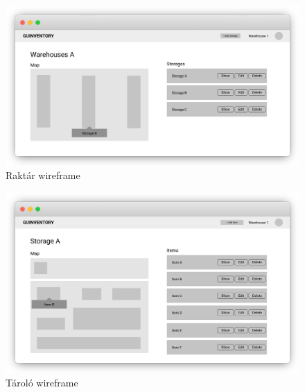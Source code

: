 \begin{figure}[!ht]
  \centering
  \includegraphics[width=150mm, keepaspectratio]{figures/wireframes/frame_warehouse.png}
  \caption{Raktár wireframe}
  \label{fig:WarehouseWireframe}
\end{figure}
  
\begin{figure}[!ht]
  \centering
  \includegraphics[width=150mm, keepaspectratio]{figures/wireframes/frame_storage.png}
  \caption{Tároló wireframe}
  \label{fig:StorageWireframe}
\end{figure}
  